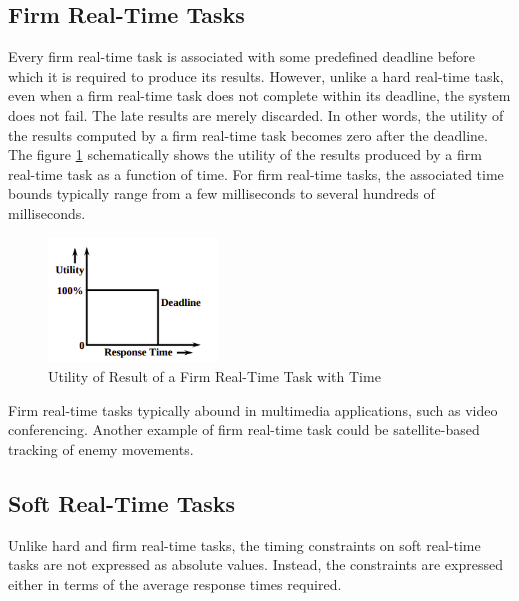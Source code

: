 \documentclass[12pt]{report}
\begin{document}
\subsection{Firm Real-Time Tasks}
Every firm real-time task is associated with some predefined deadline before which it is required to produce its results. However, unlike a hard real-time task, even when a firm real-time task does not complete within its deadline, the system does not fail. The late results are merely discarded. In other words, the utility of the results computed by a firm real-time task becomes
zero after the deadline. The figure \ref{fig:firm-rts} schematically shows the utility of the results produced by a firm real-time task as a function of time. For firm real-time tasks, the associated time bounds typically range from a few milliseconds to several hundreds of milliseconds.
\begin{figure}[h]
\centering
\includegraphics[width=0.4\textwidth]{images/firm-rts.png}
\caption{Utility of Result of a Firm Real-Time Task with Time}
\label{fig:firm-rts}
\end{figure}
Firm real-time tasks typically abound in multimedia applications, such as video conferencing. Another example of firm real-time task could be satellite-based tracking of enemy movements. 

\subsection{Soft Real-Time Tasks}
Unlike hard and firm real-time tasks, the timing constraints on soft real-time tasks are not expressed as absolute values. Instead, the constraints are expressed either in terms of the average response times required.\\
\end{document}
